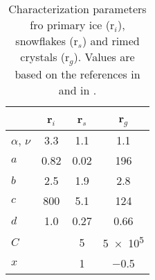 \begin{table}[h]
	\begin{center}
		\caption{Characterization parameters fro primary ice (r$_i$), snowflakes (r$_s$) and rimed crystals (r$_g$). Values are based on the references in \cite{meteo_france_meso-nh_2009} and in \cite{pinty_mixed-phased_1998}. }\label{tab:ice_parameter}
		\begin{tabular}{l|c|c|c}
			\hline \hline
            				& \textbf{r$_i$}& \textbf{r$_s$}& \textbf{r$_g$} \\ \hline\hline
            $\alpha$, $\nu$ & \num{3.3}		& \num{1.1}			& \num{1.1} \\ \hline
            $a$				& \num{0.82}	& \num{0.02}		& \num{196} \\ 
            $b$				& \num{2.5}		& \num{1.9}			& \num{2.8} \\ \hline
            $c$				& \num{800}		& \num{5.1}			& \num{124} \\ 
            $d$				& \num{1.0}		& \num{0.27}		& \num{0.66} \\ \hline
            $C$				&				& \num{5}			& \num{5e5} \\
            $x$				&				& \num{1}			& \num{-0.5} \\
			\hline \hline
		\end{tabular}
	\end{center}
\end{table}